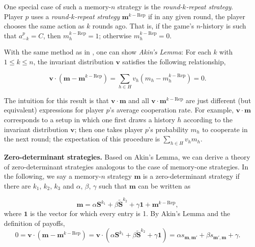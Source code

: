 \documentclass{article}
\theoremstyle{definition}
\begin{document}
One special case of such a memory-$n$ strategy is the  {\it round-$k$-repeat
strategy}. Player $p$ uses a {\it round-$k$-repeat strategy}
$\mathbf{m}^{k-\text{Rep}}$ if in any given round, the player chooses the same
action as $k$ rounds ago. That is, if the game's $n$-history is such that
$a^p_{-k}\!=\!C$, then $m^{k-\text{Rep}}_h\!=\!1$; otherwise
$m^{k-\text{Rep}}_h\!=\!0$.

With the same method as in \citep{akin:EGADS:2016}, one can show {\it Akin's
Lemma}: For each $k$ with $1\!\le\!k\!\le\!n$, the invariant distribution
$\mathbf{v}$ satisfies the following relationship,

\begin{equation} \label{Eq:AkinsLemma}
\mathbf{v} \cdot (\mathbf{m}-\mathbf{m}^{k-\text{Rep}}) \!=\! \sum_{h\in H} v_h (m_h-m_h^{k-\text{Rep}}) = 0.
\end{equation}

The intuition for this result is that $\mathbf{v}\cdot \mathbf{m}$ and all
$\mathbf{v}\cdot \mathbf{m}^{k-\text{Rep}}$ are just different (but equivalent)
expressions for player $p$'s average cooperation rate. For example,
$\mathbf{v}\cdot\mathbf{m}$ corresponds to a setup in which one first draws a
history $h$ according to the invariant distribution $\mathbf{v}$; then one takes
player $p$'s probability $m_h$ to cooperate in the next round; the expectation
of this procedure is $\sum_{h\in H} v_h m_h$.


\noindent
{\bf Zero-determinant strategies.}
Based on Akin's Lemma, we can derive a theory of zero-determinant strategies
analogous to the case of memory-one strategies. In the following, we say a
memory-$n$ strategy $\mathbf{m}$ is a zero-determinant strategy if there are
$k_1$, $k_2$, $k_3$ and $\alpha$, $\beta$, $\gamma$ such that $\mathbf{m}$ can
be written as

\begin{equation} \label{Eq:DefZD}
\mathbf{m} = \alpha \mathbf{S}^{k_1} + \beta \mathbf{\tilde{S}}^{k_2} + \gamma \mathbf{1} + \mathbf{m}^{k-\text{Rep}},  
\end{equation} 
where $\mathbf{1}$ is the vector for which every entry is 1. By Akin's Lemma and the definition of payoffs,
\begin{equation} \label{Eq:PayoffZD}
0 = \mathbf{v} \cdot  (\mathbf{m} - \mathbf{m}^{k-\text{Rep}}) = \mathbf{v} \cdot (\alpha \mathbf{S}^{k_1} + \beta \mathbf{\tilde{S}}^{k_2} + \gamma \mathbf{1} ) = \alpha s_{\mathbf{m}, \mathbf{m'}} + \beta s_{\mathbf{m'}, \mathbf{m}} + \gamma. 
\end{equation}
\end{document}
